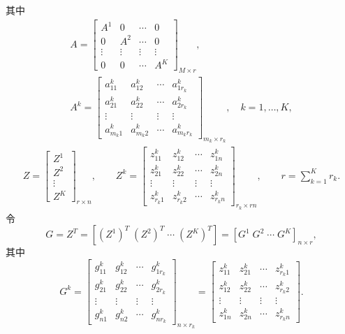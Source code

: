 其中
\begin{equation}
\begin{gathered}
A=\begin{bmatrix}A^1&0&\cdots&0\\0&A^2&\cdots&0\\\vdots&\vdots&\vdots&\vdots\\0&0&\cdots&A^K\end{bmatrix}_{M\times r},\\
A^k=\begin{bmatrix}
a_{11}^k&a_{12}^k&\cdots&a_{1r_k}^k\\
a_{21}^k&a_{22}^k&\cdots&a_{2r_k}^k\\
\vdots&\vdots&\vdots&\vdots\\
a_{m_k1}^k&a_{m_k2}^k&\cdots&a_{m_kr_k}^k
\end{bmatrix}_{m_k\times r_k},\quad k=1,\ldots,K,
\end{gathered}
\tag{4.160}
\end{equation}
\begin{equation}
\begin{gathered}
Z=\begin{bmatrix}Z^1\\Z^2\\\vdots\\Z^K\end{bmatrix}_{r\times n},\qquad
Z^k=\begin{bmatrix}
z_{11}^k&z_{12}^k&\cdots&z_{1n}^k\\
z_{21}^k&z_{22}^k&\cdots&z_{2n}^k\\
\vdots&\vdots&\vdots&\vdots\\
z_{r_k1}^k&z_{r_k2}^k&\cdots&z_{r_kn}^k
\end{bmatrix}_{r_k\times rn},\qquad r=\sum_{k=1}^{K}r_k.
\end{gathered}
\tag{4.161}
\end{equation}
令
\begin{equation}
G=Z^T=[(Z^1)^T\;(Z^2)^T\;\cdots\;(Z^K)^T]
=[G^1\;G^2\;\cdots\;G^K]_{n\times r},
\tag{4.162}
\end{equation}
其中
\[
G^k=\begin{bmatrix}
g_{11}^k&g_{12}^k&\cdots&g_{1r_k}^k\\
g_{21}^k&g_{22}^k&\cdots&g_{2r_k}^k\\
\vdots&\vdots&\vdots&\vdots\\
g_{n1}^k&g_{n2}^k&\cdots&g_{nr_k}^k
\end{bmatrix}_{n\times r_k}
=\begin{bmatrix}
z_{11}^k&z_{21}^k&\cdots&z_{r_k1}^k\\
z_{12}^k&z_{22}^k&\cdots&z_{r_k2}^k\\
\vdots&\vdots&\vdots&\vdots\\
z_{1n}^k&z_{2n}^k&\cdots&z_{r_kn}^k
\end{bmatrix}.
\]
